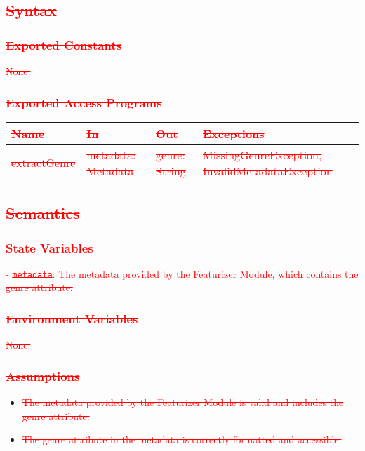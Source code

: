 \documentclass[12pt, titlepage]{article}
\begin{document}
\subsection{\textcolor{red}{\sout{Syntax}}}

\subsubsection{\textcolor{red}{\sout{Exported Constants}}}
\textcolor{red}{\sout{None.}}

\subsubsection{\textcolor{red}{\sout{Exported Access Programs}}}

\begin{center}
\begin{tabular}{p{2cm} p{4cm} p{4cm} p{2cm}}
\hline
\textcolor{red}{\sout{\textbf{Name}}} & \textcolor{red}{\sout{\textbf{In}}} & \textcolor{red}{\sout{\textbf{Out}}} & \textcolor{red}{\sout{\textbf{Exceptions}}} \\
\hline
\textcolor{red}{\sout{extractGenre}} & \textcolor{red}{\sout{metadata: Metadata}} & \textcolor{red}{\sout{genre: String}} & \textcolor{red}{\sout{MissingGenreException, InvalidMetadataException}} \\
\hline
\end{tabular}
\end{center}

\subsection{\textcolor{red}{\sout{Semantics}}}

\subsubsection{\textcolor{red}{\sout{State Variables}}}
\textcolor{red}{\sout{- \texttt{metadata}: The metadata provided by the Featurizer Module, which contains the genre attribute.}}

\subsubsection{\textcolor{red}{\sout{Environment Variables}}}
\textcolor{red}{\sout{None.}}

\subsubsection{\textcolor{red}{\sout{Assumptions}}}
\begin{itemize}
\item \textcolor{red}{\sout{The metadata provided by the Featurizer Module is valid and includes the genre attribute.}}
\item \textcolor{red}{\sout{The genre attribute in the metadata is correctly formatted and accessible.}}
\end{itemize}
\end{document}
